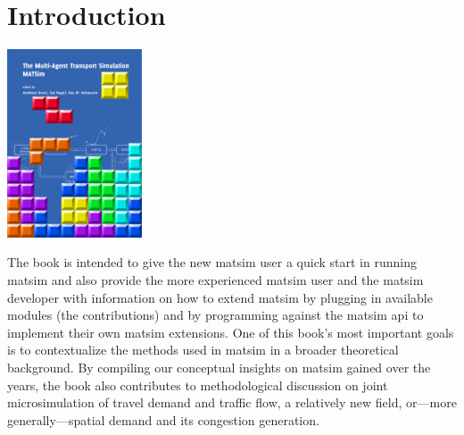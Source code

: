 \chapter*{Introduction}

\begin{center} \includegraphics[width=0.3\textwidth, angle=0]{frontmatter/figures/MATSimBook} \end{center}

%
%
The book is intended to give the new \gls{matsim} user a quick start in running \gls{matsim} and also provide the more experienced \gls{matsim} user and the \gls{matsim} developer with 
information on how to extend \gls{matsim} by plugging in available modules (\ie the \glspl{contribution}) and by programming against the \gls{matsim} \gls{api} to implement their own \gls{matsim} \glspl{extension}. One of this book's most important goals is to contextualize the methods used in \gls{matsim} in a broader theoretical background. By compiling our conceptual insights on \gls{matsim} gained over the years, the book also contributes to methodological discussion on joint \gls{microsimulation} of travel demand and traffic flow, a relatively new field, or---more generally---spatial demand and its congestion generation.

